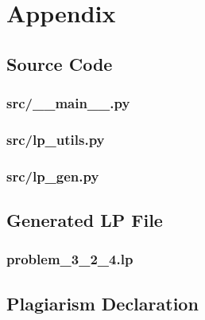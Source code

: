 \documentclass[12pt]{article} %
\begin{document}

\section{Appendix}


\subsection{Source Code}

\subsubsection{src/\_\_main\_\_.py}


\subsubsection{src/lp\_utils.py}


\subsubsection{src/lp\_gen.py}



\subsection{Generated LP File}

\subsubsection{problem\_3\_2\_4.lp}
% 


\subsection{Plagiarism Declaration}

\end{document}
